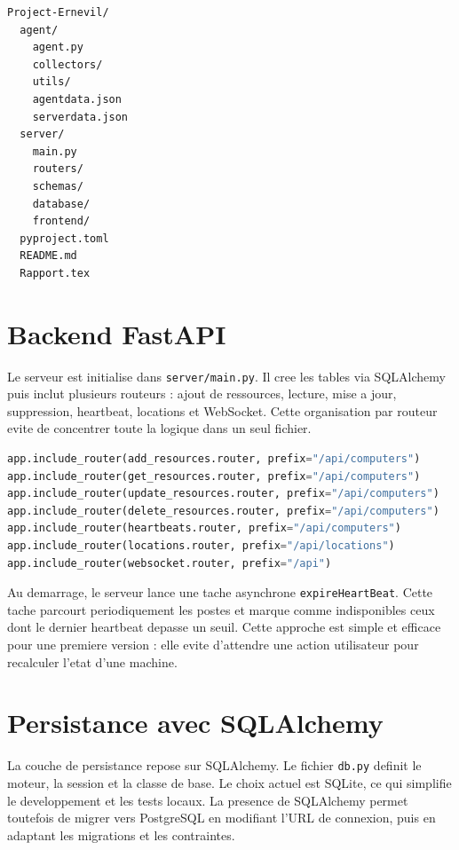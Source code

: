 \documentclass[12pt,a4paper]{report}
\begin{document}
\begin{lstlisting}[language=bash,caption={Structure simplifiee du depot}]
Project-Ernevil/
  agent/
    agent.py
    collectors/
    utils/
    agentdata.json
    serverdata.json
  server/
    main.py
    routers/
    schemas/
    database/
    frontend/
  pyproject.toml
  README.md
  Rapport.tex
\end{lstlisting}

\section{Backend FastAPI}
Le serveur est initialise dans \texttt{server/main.py}. Il cree les tables via SQLAlchemy puis inclut plusieurs routeurs : ajout de ressources, lecture, mise a jour, suppression, heartbeat, locations et WebSocket. Cette organisation par routeur evite de concentrer toute la logique dans un seul fichier.

\begin{lstlisting}[language=Python,caption={Initialisation des routeurs dans FastAPI}]
app.include_router(add_resources.router, prefix="/api/computers")
app.include_router(get_resources.router, prefix="/api/computers")
app.include_router(update_resources.router, prefix="/api/computers")
app.include_router(delete_resources.router, prefix="/api/computers")
app.include_router(heartbeats.router, prefix="/api/computers")
app.include_router(locations.router, prefix="/api/locations")
app.include_router(websocket.router, prefix="/api")
\end{lstlisting}

Au demarrage, le serveur lance une tache asynchrone \texttt{expireHeartBeat}. Cette tache parcourt periodiquement les postes et marque comme indisponibles ceux dont le dernier heartbeat depasse un seuil. Cette approche est simple et efficace pour une premiere version : elle evite d'attendre une action utilisateur pour recalculer l'etat d'une machine.

\section{Persistance avec SQLAlchemy}
La couche de persistance repose sur SQLAlchemy. Le fichier \texttt{db.py} definit le moteur, la session et la classe de base. Le choix actuel est SQLite, ce qui simplifie le developpement et les tests locaux. La presence de SQLAlchemy permet toutefois de migrer vers PostgreSQL en modifiant l'URL de connexion, puis en adaptant les migrations et les contraintes.
\end{document}
